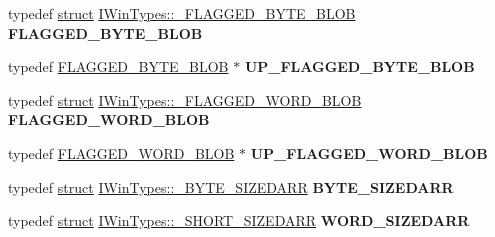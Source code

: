 \begin{DoxyCompactItemize}
\mbox{\label{interface_i_win_types_a733157c99bf96f4eee53c91f3ae3f282}} 
typedef \hyperlink{interfacestruct}{struct} \hyperlink{struct_i_win_types_1_1___f_l_a_g_g_e_d___b_y_t_e___b_l_o_b}{I\+Win\+Types\+::\+\_\+\+F\+L\+A\+G\+G\+E\+D\+\_\+\+B\+Y\+T\+E\+\_\+\+B\+L\+OB} {\bfseries F\+L\+A\+G\+G\+E\+D\+\_\+\+B\+Y\+T\+E\+\_\+\+B\+L\+OB}
\item 
\mbox{\label{interface_i_win_types_ac0ac2f4669705ab1fbf2c7fa839b4225}} 
typedef \hyperlink{struct_i_win_types_1_1___f_l_a_g_g_e_d___b_y_t_e___b_l_o_b}{F\+L\+A\+G\+G\+E\+D\+\_\+\+B\+Y\+T\+E\+\_\+\+B\+L\+OB} $\ast$ {\bfseries U\+P\+\_\+\+F\+L\+A\+G\+G\+E\+D\+\_\+\+B\+Y\+T\+E\+\_\+\+B\+L\+OB}
\item 
\mbox{\label{interface_i_win_types_ab3df292003ec8446e84c19436641ba27}} 
typedef \hyperlink{interfacestruct}{struct} \hyperlink{struct_i_win_types_1_1___f_l_a_g_g_e_d___w_o_r_d___b_l_o_b}{I\+Win\+Types\+::\+\_\+\+F\+L\+A\+G\+G\+E\+D\+\_\+\+W\+O\+R\+D\+\_\+\+B\+L\+OB} {\bfseries F\+L\+A\+G\+G\+E\+D\+\_\+\+W\+O\+R\+D\+\_\+\+B\+L\+OB}
\item 
\mbox{\label{interface_i_win_types_a05d363d54551a40b14de21c01a62d3fa}} 
typedef \hyperlink{struct_i_win_types_1_1___f_l_a_g_g_e_d___w_o_r_d___b_l_o_b}{F\+L\+A\+G\+G\+E\+D\+\_\+\+W\+O\+R\+D\+\_\+\+B\+L\+OB} $\ast$ {\bfseries U\+P\+\_\+\+F\+L\+A\+G\+G\+E\+D\+\_\+\+W\+O\+R\+D\+\_\+\+B\+L\+OB}
\item 
\mbox{\label{interface_i_win_types_aed3fe4cae4570be4511b9630e02d7982}} 
typedef \hyperlink{interfacestruct}{struct} \hyperlink{struct_i_win_types_1_1___b_y_t_e___s_i_z_e_d_a_r_r}{I\+Win\+Types\+::\+\_\+\+B\+Y\+T\+E\+\_\+\+S\+I\+Z\+E\+D\+A\+RR} {\bfseries B\+Y\+T\+E\+\_\+\+S\+I\+Z\+E\+D\+A\+RR}
\item 
\mbox{\label{interface_i_win_types_a94ad22bfe35902f6b539fc6121074eba}} 
typedef \hyperlink{interfacestruct}{struct} \hyperlink{struct_i_win_types_1_1___s_h_o_r_t___s_i_z_e_d_a_r_r}{I\+Win\+Types\+::\+\_\+\+S\+H\+O\+R\+T\+\_\+\+S\+I\+Z\+E\+D\+A\+RR} {\bfseries W\+O\+R\+D\+\_\+\+S\+I\+Z\+E\+D\+A\+RR}
\item 
\mbox{\label{interface_i_win_types_a3e23879acb388313ab86af2090a1f957}} 

\end{DoxyCompactItemize}
